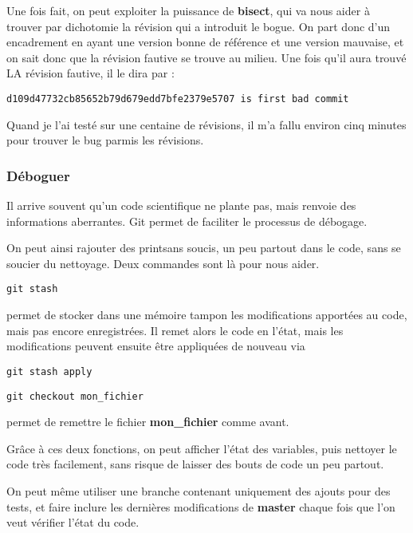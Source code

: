 Une fois fait, on peut exploiter la puissance de \textbf{bisect}, qui va nous aider à trouver par dichotomie la révision qui a introduit le bogue. On part donc d'un encadrement en ayant une version bonne de référence et une version mauvaise, et on sait donc que la révision fautive se trouve au milieu.
Une fois qu'il aura trouvé LA révision fautive, il le dira par :
\begin{verbatim}
d109d47732cb85652b79d679edd7bfe2379e5707 is first bad commit
\end{verbatim}

Quand je l'ai testé sur une centaine de révisions, il m'a fallu environ cinq minutes pour trouver le bug parmis les révisions.


\subsubsection{Déboguer}
Il arrive souvent qu'un code scientifique ne plante pas, mais renvoie des informations aberrantes. Git permet de faciliter le processus de débogage. 

On peut ainsi rajouter des \og print\fg sans soucis, un peu partout dans le code, sans se soucier du nettoyage. Deux commandes sont là pour nous aider. 

\begin{verbatim}
git stash
\end{verbatim}
permet de stocker dans une mémoire tampon les modifications apportées au code, mais pas encore enregistrées. Il remet alors le code en l'état, mais les modifications peuvent ensuite être appliquées de nouveau via 
\begin{verbatim}
git stash apply
\end{verbatim}

\bigskip

\begin{verbatim}
git checkout mon_fichier
\end{verbatim}
permet de remettre le fichier \textbf{mon\_fichier} comme avant. 

\bigskip

Grâce à ces deux fonctions, on peut afficher l'état des variables, puis nettoyer le code très facilement, sans risque de laisser des bouts de code un peu partout. 

On peut même utiliser une branche contenant uniquement des ajouts pour des tests, et faire inclure les dernières modifications de \textbf{master} chaque fois que l'on veut vérifier l'état du code. 

